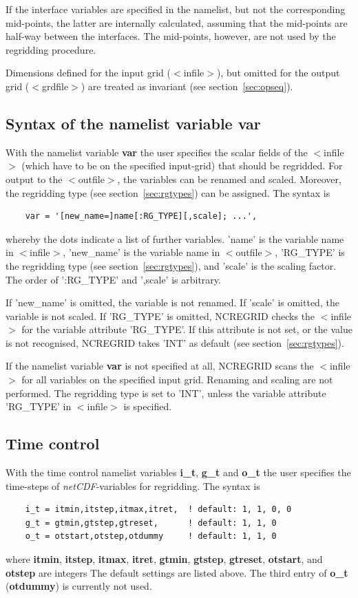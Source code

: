 \documentclass[12pt, a4paper]{article}
\begin{document}
If the interface variables are specified in the namelist, but not the
corresponding mid-points, the latter are internally calculated,
assuming that the mid-points are half-way between the interfaces.
The mid-points, however, are not used by the regridding procedure.

Dimensions defined for the input grid ($<$infile$>$),
but omitted for the output grid ($<$grdfile$>$) are treated as invariant
(see section~\ref{sec:opseq}).

\subsection{Syntax of the namelist variable var}
\label{sec:varstr}
With the namelist variable {\bf var} the user specifies the scalar
fields of the
$<$infile$>$ (which have to be on the specified input-grid) that should be
regridded. For output to the $<$outfile$>$, the variables can be renamed and
scaled. Moreover, the regridding type (see section~\ref{sec:rgtypes})
can be assigned. The syntax is
\begin{verbatim}
    var = '[new_name=]name[:RG_TYPE][,scale]; ...',
\end{verbatim}
whereby the dots indicate a list of further variables.
'name' is the variable name
in $<$infile$>$, 'new\_name' is the variable name in $<$outfile$>$,
'RG\_TYPE' is the regridding type (see section~\ref{sec:rgtypes}),
and 'scale' is the scaling factor. The
order of ':RG\_TYPE' and ',scale'  is arbitrary.

If 'new\_name' is omitted, the variable is not renamed. If 'scale'
is omitted, the variable is not scaled.
If 'RG\_TYPE' is omitted, NCREGRID checks the $<$infile$>$
for the variable attribute 'RG\_TYPE'. If this attribute is not set,
or the value is not recognised, NCREGRID takes 'INT' as default
(see section~\ref{sec:rgtypes}).

If the namelist variable {\bf var} is not specified at all, NCREGRID scans the
$<$infile$>$ for all variables on the specified input grid. Renaming and
scaling are not performed. The regridding type
is set to 'INT', unless the variable attribute 'RG\_TYPE' in
$<$infile$>$ is specified.

\subsection{Time control}
\label{sec:tctrl}
With the time control namelist variables {\bf i\_t}, {\bf g\_t} and {\bf o\_t}
the user specifies the time-steps of {\it netCDF}-variables for regridding.
The syntax is
\begin{verbatim}
    i_t = itmin,itstep,itmax,itret,  ! default: 1, 1, 0, 0
    g_t = gtmin,gtstep,gtreset,      ! default: 1, 1, 0
    o_t = otstart,otstep,otdummy     ! default: 1, 1, 0
\end{verbatim}
where {\bf itmin}, {\bf itstep}, {\bf itmax}, {\bf itret},
{\bf gtmin}, {\bf gtstep}, {\bf gtreset},
{\bf otstart}, and {\bf otstep} are integers
The default settings are listed above.
The third entry of {\bf o\_t} ({\bf otdummy}) is currently not used.
\end{document}
